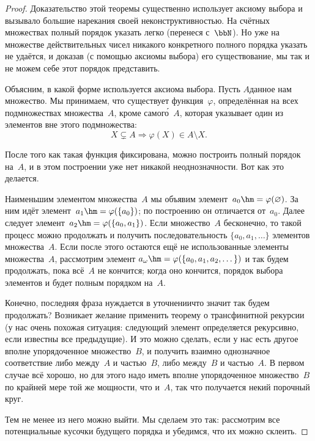 \begin{proof}
Доказательство этой теоремы существенно использует аксиому
выбора и вызывало большие нарекания
своей неконструктивностью.
На счётных множествах полный порядок указать легко
(перенеся с~$\bbN$). Но уже на множестве действительных
чисел никакого конкретного полного порядка указать не удаётся, и
доказав (с помощью аксиомы выбора) его существование, мы так и
не можем себе этот порядок представить.

Объясним, в какой форме используется аксиома
выбора. Пусть $A$\т данное нам множество. Мы принимаем, что
существует функция~$\varphi$, определённая на всех подмножествах
множества~$A$, кроме самог\'о~$A$, которая указывает
один из элементов вне этого подмножества:
        $$
X\subsetneq A \Rightarrow \varphi(X)\in A\setminus X.
        $$

После того как такая функция фиксирована, можно построить
полный порядок на~$A$, и в этом построении уже нет никакой
неоднозначности. Вот как это делается.

Наименьшим элементом множества~$A$ мы объявим
элемент~$a_0\hm=\varphi(\varnothing)$. За ним идёт
элемент~$a_1\hm=\varphi(\{a_0\})$; по построению он отличается от~$a_0$.
Далее следует
элемент~$a_2\hm=\varphi(\{a_0,a_1\})$. Если
множество~$A$ бесконечно, то такой процесс можно продолжать и
получить последовательность $\{a_0,a_1,\dots\}$ элементов
множества~$A$. Если после этого остаются ещё не использованные
элементы множества~$A$, рассмотрим элемент
$a_\omega\hm=\varphi(\{a_0,a_1,a_2,\dots\})$ и так будем продолжать,
пока всё~$A$ не кончится; когда оно кончится, порядок выбора
элементов и будет полным порядком на~$A$.

Конечно, последняя фраза нуждается в уточнении\т что значит 
так будем продолжать? Возникает желание применить теорему о
трансфинитной рекурсии (у нас очень похожая ситуация: следующий
элемент определяется рекурсивно, если известны все предыдущие).
И это можно сделать, если у нас есть другое вполне упорядоченное
множество~$B$, и получить взаимно однозначное соответствие
либо между~$A$ и частью~$B$, либо между~$B$ и частью~$A$. В
первом случае всё хорошо, но для этого надо иметь вполне
упорядоченное множество~$B$ по крайней мере той же мощности, что
и~$A$, так что получается некий порочный круг.

Тем не менее из него можно выйти. Мы сделаем это так:
рассмотрим все потенциальные кусочки будущего порядка и
убедимся, что их можно склеить.


\end{proof}
